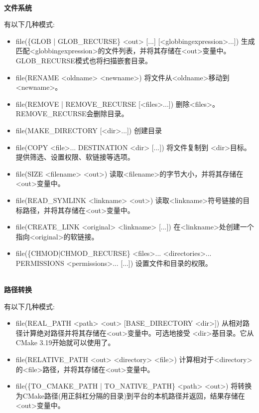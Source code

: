 \hspace*{\fill} \\ %
\noindent
\textbf{文件系统}

有以下几种模式:

\begin{itemize}
\item 
file(\{GLOB | GLOB\_RECURSE\} <out> [...] [<globbingexpression>...]) 生成匹配<globbingexpression>的文件列表，并将其存储在<out>变量中。GLOB\_RECURSE模式也将扫描嵌套目录。

\item 
file(RENAME <oldname> <newname>) 将文件从<oldname>移动到<newname>。

\item 
file({REMOVE | REMOVE\_RECURSE } [<files>...]) 删除<files>。REMOVE\_RECURSE会删除目录。

\item 
file(MAKE\_DIRECTORY [<dir>...]) 创建目录

\item 
file(COPY <file>... DESTINATION <dir> [...]) 将文件复制到
<dir>目标。提供筛选、设置权限、软链接等选项。

\item 
file(SIZE <filename> <out>) 读取<filename>的字节大小，并将其存储在<out>变量中。

\item 
file(READ\_SYMLINK <linkname> <out>) 读取<linkname>符号链接的目标路径，并将其存储在<out>变量中。

\item
file(CREATE\_LINK <original> <linkname> [...]) 在<linkname>处创建一个指向<original>的软链接。

\item 
file(\{CHMOD|CHMOD\_RECURSE\} <files>... <directories>... PERMISSIONS <permissions>... [...]) 设置文件和目录的权限。
\end{itemize}

\hspace*{\fill} \\ %
\noindent
\textbf{路径转换}

有以下几种模式:

\begin{itemize}
\item 
file(REAL\_PATH <path> <out> [BASE\_DIRECTORY <dir>]) 从相对路径计算绝对路径并将其存储在<out>变量中。可选地接受
<dir>基目录。它从CMake 3.19开始就可以使用了。

\item 
file(RELATIVE\_PATH <out> <directory> <file>) 计算相对于<directory>的<file>路径，并将其存储在<out>变量中。

\item 
file(\{TO\_CMAKE\_PATH | TO\_NATIVE\_PATH\} <path> <out>) 将转换为CMake路径(用正斜杠分隔的目录)到平台的本机路径并返回，结果存储在<out>变量中。
\end{itemize}

